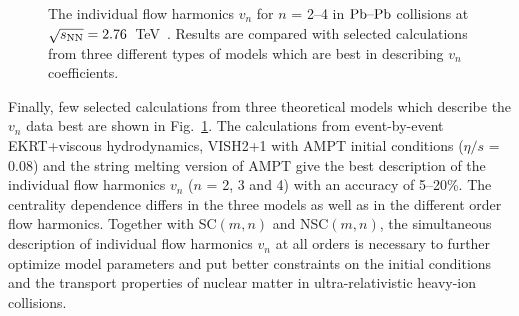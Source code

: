 \begin{figure}[h]
\begin{center}
        \caption{The individual flow harmonics $v_n$ for $n$ = 2--4 in $\textnormal{Pb--Pb}$ collisions at $\sqrt{s_{\textnormal{NN}}}=2.76$~TeV~\cite{Adam:2016izf}. Results are compared with selected calculations from three different types of models which are best in describing $v_n$ coefficients.}
        \label{fig:Figure_A4}
              \end{center}
\end{figure}

Finally, few selected calculations from three theoretical models which describe the $v_n$ data best are shown in Fig.~\ref{fig:Figure_A4}.
The calculations from event-by-event EKRT+viscous hydrodynamics, VISH2+1 with AMPT initial conditions ($\eta/s$ = 0.08) and the string melting version of AMPT give the best description of the individual flow harmonics $v_n$ ($n$ = 2, 3 and 4) with an accuracy of 5--20\%. The centrality dependence differs in the three models as well as in the different order flow harmonics.
Together with SC$(m,n)$ and NSC$(m,n)$, the simultaneous description of individual flow harmonics $v_n$ at all orders is necessary to further optimize model parameters and put better constraints on the initial conditions and the transport properties of nuclear matter in ultra-relativistic heavy-ion collisions.


